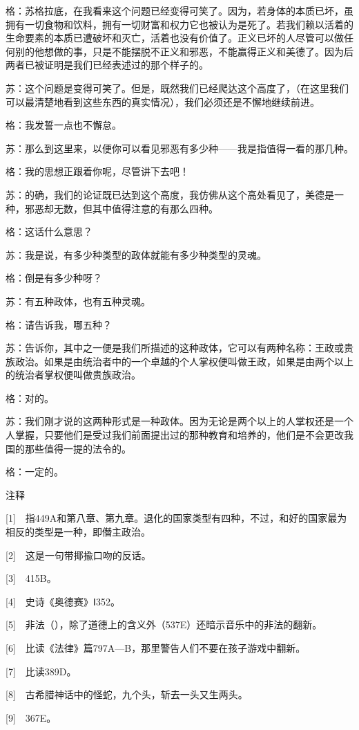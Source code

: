 \documentclass[12pt,oneside]{book}
\begin{document}
格：苏格拉底，在我看来这个问题已经变得可笑了。因为，若身体的本质已坏，虽拥有一切食物和饮料，拥有一切财富和权力它也被认为是死了。若我们赖以活着的生命要素的本质已遭破坏和灭亡，活着也没有价值了。正义已坏的人尽管可以做任何别的他想做的事，只是不能摆脱不正义和邪恶，不能赢得正义和美德了。因为后两者已被证明是我们已经表述过的那个样子的。

苏：这个问题是变得可笑了。但是，既然我们已经爬达这个高度了，（在这里我们可以最清楚地看到这些东西的真实情况），我们必须还是不懈地继续前进。

格：我发誓一点也不懈怠。

苏：那么到这里来，以便你可以看见邪恶有多少种——我是指值得一看的那几种。

格：我的思想正跟着你呢，尽管讲下去吧！

苏：的确，我们的论证既已达到这个高度，我仿佛从这个高处看见了，美德是一种，邪恶却无数，但其中值得注意的有那么四种。

格：这话什么意思？

苏：我是说，有多少种类型的政体就能有多少种类型的灵魂。

格：倒是有多少种呀？

苏：有五种政体，也有五种灵魂。

格：请告诉我，哪五种？

苏：告诉你，其中之一便是我们所描述的这种政体，它可以有两种名称：王政或贵族政治。如果是由统治者中的一个卓越的个人掌权便叫做王政，如果是由两个以上的统治者掌权便叫做贵族政治。

格：对的。

苏：我们刚才说的这两种形式是一种政体。因为无论是两个以上的人掌权还是一个人掌握，只要他们是受过我们前面提出过的那种教育和培养的，他们是不会更改我国的那些值得一提的法令的。

格：一定的。

注释

[1]　指449A和第八章、第九章。退化的国家类型有四种，不过，和好的国家最为相反的类型是一种，即僭主政治。

[2]　这是一句带揶揄口吻的反话。

[3]　415B。

[4]　史诗《奥德赛》Ⅰ352。

[5]　非法（），除了道德上的含义外（537E）还暗示音乐中的非法的翻新。

[6]　比读《法律》篇797A—B，那里警告人们不要在孩子游戏中翻新。

[7]　比读389D。

[8]　古希腊神话中的怪蛇，九个头，斩去一头又生两头。

[9]　367E。
\end{document}
